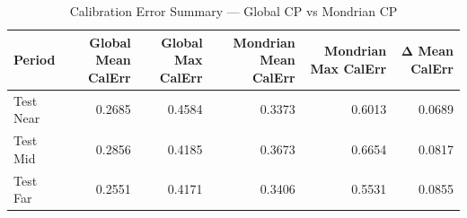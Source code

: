 \begin{table}
\caption{Calibration Error Summary — Global CP vs Mondrian CP}
\label{tab:t4b_4_cal_error}
\begin{tabular}{lrrrrr}
\toprule
Period & Global Mean CalErr & Global Max CalErr & Mondrian Mean CalErr & Mondrian Max CalErr & Δ Mean CalErr \\
\midrule
Test Near & 0.2685 & 0.4584 & 0.3373 & 0.6013 & 0.0689 \\
Test Mid & 0.2856 & 0.4185 & 0.3673 & 0.6654 & 0.0817 \\
Test Far & 0.2551 & 0.4171 & 0.3406 & 0.5531 & 0.0855 \\
\bottomrule
\end{tabular}
\end{table}
